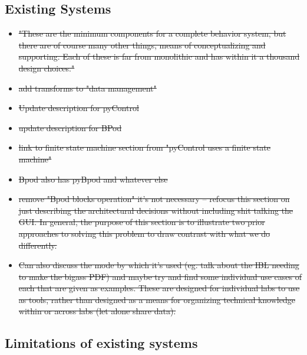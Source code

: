 \subsection{Existing Systems}

\begin{itemize}
	\item \sout{"These are the minimum components for a complete behavior system, but there are of course many other things, means of conceptualizing and supporting. Each of these is far from monolithic and has within it a thousand design choices."}
	\item \sout{add transforms to "data management"}
	\item \sout{Update description for pyControl}
	\item \sout{update description for BPod}
	\item \sout{link to finite state machine section from "pyControl uses a finite state machine"}
	\item \sout{Bpod also has pyBpod and whatever else}
	\item \sout{remove "Bpod blocks operation" it's not necessary -- refocus this section on just describing the architectural decisions without including shit talking the GUI. In general, the purpose of this section is to illustrate two prior approaches to solving this problem to draw contrast with what we do differently.}
	\item \sout{Can also discuss the mode by which it's used (eg. talk about the IBL needing to make the bigass PDF) and maybe try and find some individual use cases of each that are given as examples. These are designed for individual labs to use as tools, rather than designed as a means for organizing technical knowledge within or across labs (let alone share data).}
\end{itemize}

\subsection{Limitations of existing systems}

